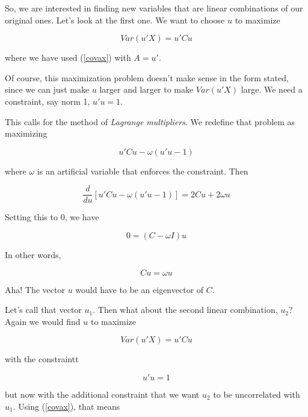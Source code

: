 So, we are interested in finding new variables that are linear
combinations of our original ones.  Let's look at the first one. 
We want to choose $u$ to maximize 

\begin{equation}
Var(u'X) = u' C u
\end{equation}

where we have used (\ref{covax}) with $A = u'$.

Of course, this maximization problem doesn't make sense in the form
stated, since we can just make $u$ larger and larger to make $Var(u'X)$
large.  We need a constraint, say norm 1, $u'u = 1$.   

This calls for the method of \textit{Lagrange multipliers}.  We redefine
that problem as maximizing 

\begin{equation}
u'Cu - \omega (u'u - 1)
\end{equation}

where $\omega$ is an artificial variable that enforces the constraint.
Then

\begin{equation}
\frac{d}{du} [u'Cu - \omega (u'u - 1)] = 2 Cu + 2 \omega u 
\end{equation}

Setting this to 0, we have

\begin{equation}
0 = (C - \omega I) u
\end{equation}

In other words,

\begin{equation}
Cu = \omega u
\end{equation}

Aha!  The vector $u$ would have to be an eigenvector of $C$.  

Let's call that vector $u_1$.  Then what about the second linear
combination, $u_2$?  Again we would find $u$ to maximize

\begin{equation}
Var(u'X) = u' C u
\end{equation}

with the constraintt

\begin{equation}
u'u = 1
\end{equation}

but now with the additional constraint that we want $u_2$ to be
uncorrelated with $u_1$.  Using (\ref{covax}), that means

